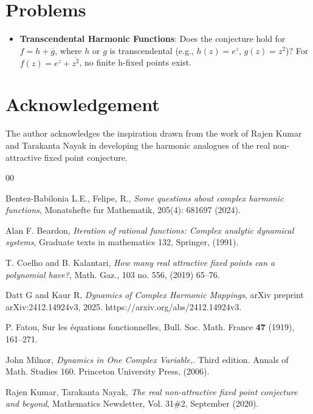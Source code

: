 \documentclass[a4paper,12pt,reqno]{amsart}
\begin{document}
\section{Problems}

\begin{itemize}
    \item \textbf{Transcendental Harmonic Functions}: Does the conjecture hold for $f = h + \overline{g}$, where $h$ or $g$ is transcendental (e.g., $h(z) = e^z$, $g(z) = z^2$)? For $f(z) = e^z + \overline{z^2}$, no finite h-fixed points exist.
 
\end{itemize}
\section{Acknowledgement}
The author acknowledges the inspiration drawn from the work of Rajen Kumar and Tarakanta Nayak \cite{The real non-attractive fixed point conjecture and beyond} in developing the harmonic analogues of the real non-attractive fixed point conjecture.
\begin{thebibliography}{00}

 Bentez-Babilonia L.E., Felipe, R.,
\textit{Some questions about complex harmonic functions},  Monatshefte
 fur Mathematik, 205(4): 681697 (2024).


	Alan F. Beardon,
	\textit{Iteration of rational functions: Complex analytic dynamical systems}, Graduate texts in mathematics 132, Springer, (1991).

 T. Coelho and B. Kalantari, 
\textit{How many real attractive fixed points can a polynomial have?}, Math. Gaz.,
103 no. 556, (2019) 65–76.

 Datt G and Kaur R, 
\textit{Dynamics of Complex Harmonic Mappings}, arXiv preprint arXiv:2412.14924v3, 2025. https://arxiv.org/abs/2412.14924v3.


P. Fatou, Sur les \'{e}quations fonctionnelles, Bull. Soc. Math. France {\bf 47} (1919), 161--271.




John Milnor,
	\textit{Dynamics in One Complex Variable,}.
 Third edition. Annals of Math.
Studies 160. Princeton University Press, (2006).


 Rajen Kumar, Tarakanta Nayak,
	\textit{The real non-attractive fixed point conjecture and beyond},
	Mathematics Newsletter, Vol. 31\quad $\#$2, September (2020).		
\end{thebibliography}
\end{document}
